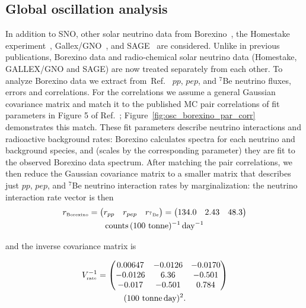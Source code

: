 \documentclass[aps,prd,reprint,superscriptaddress,floatfix,altaffilletter,nofootinbib]{revtex4-2}
\begin{document}
\subsection{Global oscillation analysis}
\label{sec:global}


In addition to SNO, other solar neutrino data from Borexino~\cite{Agostini:2019}, the Homestake experiment~\cite{Cleveland:1998nv}, Gallex/GNO~\cite{Altmann:2005ix}, and SAGE~\cite{Abdurashitov:2009tn} are considered.
Unlike in previous publications, Borexino data and radio-chemical solar neutrino data (Homestake, GALLEX/GNO and SAGE) are now treated separately from each other. To analyze Borexino data we extract from~Ref.~\cite{Agostini:2019} $pp$, $pep$, and $^{7}$Be neutrino fluxes, errors and correlations. For the correlations we assume a general Gaussian covariance matrix and match it to the published MC pair correlations of fit parameters in Figure 5 of Ref.~\cite{Agostini:2019}; Figure~\ref{fig:osc_borexino_par_corr} demonstrates this match. These fit parameters describe neutrino interactions and radioactive background rates: Borexino calculates spectra for each neutrino and background species, and (scales by the corresponding parameter) they are fit to the observed Borexino data spectrum. After matching the pair correlations, we then reduce the Gaussian covariance matrix to a smaller matrix that describes just $pp$, $pep$, and $^7$Be neutrino interaction rates by marginalization: the neutrino interaction rate vector is then
\begin{multline}
        r_{\mbox{\tiny Borexino}}=\begin{pmatrix} 
    r_{pp} & r_{pep} & r_{^7\mbox{\tiny Be}}
    \end{pmatrix}
    =\begin{pmatrix} 
    134.0 & 2.43 &48.3
    \end{pmatrix} \\
    \mathrm{counts \, (100~tonne)^{-1}  \, day^{-1}} \notag
\end{multline}



and the inverse covariance matrix is

\begin{multline}
    V^{-1}_{\mbox{\tiny rate}} = \begin{pmatrix}
    0.00647 & -0.0126 & -0.0170 \\
    -0.0126 &  6.36 & -0.501 \\
    -0.017 & -0.501 &  0.784
    \end{pmatrix} \\
    (\mathrm{100~tonne \, day})^{2}. \notag
\end{multline}
\end{document}
